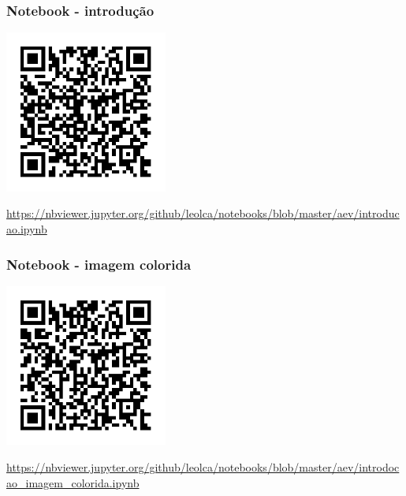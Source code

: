 \begin{frame}%
  \frametitle{Notebook - introdução}
  \centering
  \includegraphics[width=0.4\textwidth]{images/qrcode-jupyter-intro.pdf}

  \url{https://nbviewer.jupyter.org/github/leolca/notebooks/blob/master/aev/introducao.ipynb}
\end{frame} 

\begin{frame}%
  \frametitle{Notebook - imagem colorida}
  \centering
  \includegraphics[width=0.4\textwidth]{images/qrcode-jupyter-im-color.pdf}

  \url{https://nbviewer.jupyter.org/github/leolca/notebooks/blob/master/aev/introdocao_imagem_colorida.ipynb}
\end{frame} 


